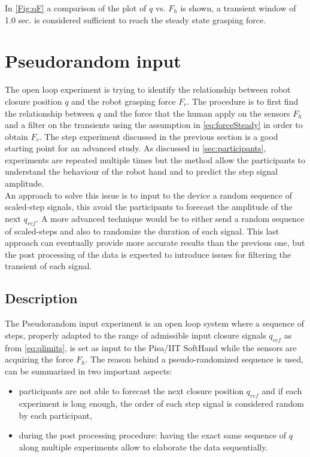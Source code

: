 In \ref{Fig:qF} a comparison of the plot of $q$ vs. $F_{h}$ is shown, a transient window of 1.0 sec. is considered sufficient to reach the steady state grasping force. 

\section{Pseudorandom input}\label{sec:pseudo}
The open loop experiment is trying to identify the relationship between robot closure position $q$ and the robot grasping force $F_{r}$. The procedure is to first find the relationship between $q$ and the force that the human apply on the sensors $F_{h}$ and a filter on the transients using the assumption in \eqref{eq:forceSteady} in order to obtain $F_{r}$. 
The step experiment discussed in the previous section is a good starting point for an advanced study. 
As discussed in \ref{sec:participants}, experiments are repeated multiple times but the method allow the participants to understand the behaviour of the robot hand and to predict the step signal amplitude. \\
An approach to solve this issue is to input to the device a random sequence of scaled-step signals, this avoid the participants to forecast the amplitude of the next $q_{ref}$. A more advanced technique would be to either send a random sequence of scaled-steps and also to randomize the duration of each signal. This last approach can eventually provide more accurate results than the previous one, but the post processing of the data is expected to introduce issues for filtering the transient of each signal.
%
\subsection{Description}
The Pseudorandom input experiment is an open loop system where a sequence of steps, properly adapted to the range of admissible input closure signals $q_{ref}$ as from \eqref{eq:qlimits}, is set as input to the Pisa/IIT SoftHand while the sensors are acquiring the force $F_{h}$.
The reason behind a pseudo-randomized sequence is used, can be summarized in two important aspects:
\begin{itemize}
\item participants are not able to forecast the next closure position $q_{ref}$ and if each experiment is long enough, the order of each step signal is considered random by each participant,
\item during the post processing procedure: having the exact same sequence of $q$ along multiple experiments allow to elaborate the data sequentially.
\end{itemize}

